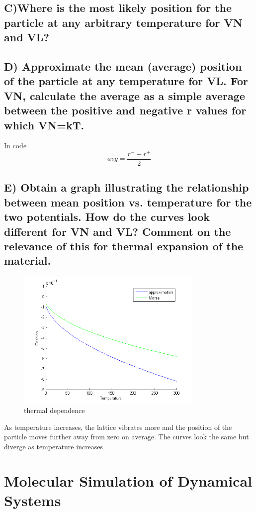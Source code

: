 \documentclass[paper=a4, fontsize=12pt]{scrartcl} %
\numberwithin{equation}{section} %
\numberwithin{figure}{section} %
\numberwithin{table}{section} %
\begin{document}
\subsection*{\small C)Where is the most likely position for the particle at any arbitrary temperature for VN and VL?}
\begin{center}
\end{center}
\subsection*{\small D) Approximate the mean (average) position of the particle at any temperature for VL. For VN, calculate the average as a simple average between the positive and negative r values for which VN=kT.}
In code
\[avg = \frac{r^- + r^+}{2}\]
\subsection*{\small E) Obtain a graph illustrating the relationship between mean position vs. temperature for the two potentials. How do the curves look different for VN and VL? Comment on the relevance of this for thermal expansion of the material.}
\begin{figure}[H]
  \centering
      \includegraphics[width=0.8\textwidth]{temp.png}
  \caption{thermal dependence}
\end{figure}
As temperature increases, the lattice vibrates more and the position of the particle moves further away from zero on average. The curves look the same but diverge as temperature increases
\section{\small{Molecular Simulation of Dynamical Systems}}
\end{document}
